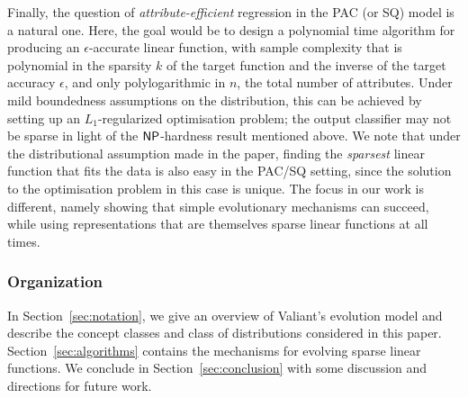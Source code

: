 Finally, the question of \emph{attribute-efficient} regression in the PAC (or
SQ) model is a natural one. Here, the goal would be to design a polynomial time
algorithm for producing an $\epsilon$-accurate linear function, with sample
complexity that is polynomial in the sparsity $k$ of the target function and the
inverse of the target accuracy $\epsilon$, and only polylogarithmic in $n$, the
total number of attributes. Under mild boundedness assumptions on the
distribution, this can be achieved by setting up an $L_1$-regularized
optimisation problem; the output classifier may not be sparse in light of the
$\mathsf{NP}$-hardness result mentioned above. We note that under the distributional
assumption made in the paper, finding the \emph{sparsest} linear function that
fits the data is also easy in the PAC/SQ setting, since the solution to the
optimisation problem in this case is unique. The focus in our work is different,
namely showing that simple evolutionary mechanisms can succeed, while using
representations that are themselves sparse linear functions at all times.

\subsubsection*{Organization}

In Section~\ref{sec:notation}, we give an overview of Valiant's evolution model
and describe the concept classes and class of distributions considered in this
paper.  Section~\ref{sec:algorithms} contains the mechanisms for evolving sparse
linear functions. We conclude in Section~\ref{sec:conclusion} with some
discussion and directions for future work.
